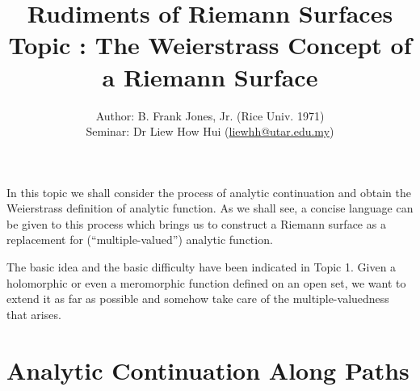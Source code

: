 \documentclass[a4paper,11pt]{article}
\newcounter{topic}
\begin{document}
\title{{\sc Rudiments of Riemann Surfaces\\
    Topic \thetopic{}: The Weierstrass Concept of a Riemann Surface}}
\author{Author: B. Frank Jones, Jr. (Rice Univ. 1971)\\
Seminar: Dr Liew How Hui (\url{liewhh@utar.edu.my})}
\date{}

\maketitle

In this topic we shall consider the process of analytic continuation
and obtain the Weierstrass definition of analytic function.  As we
shall see, a concise language can be given to this process which
brings us to construct a Riemann surface as a replacement for
(``multiple-valued'') analytic function.

The basic idea and the basic difficulty have been indicated in Topic
1.  Given a holomorphic or even a meromorphic function defined on an
open set, we want to extend it as far as possible and somehow take
care of the multiple-valuedness that arises.

\section{Analytic Continuation Along Paths}
\end{document}
